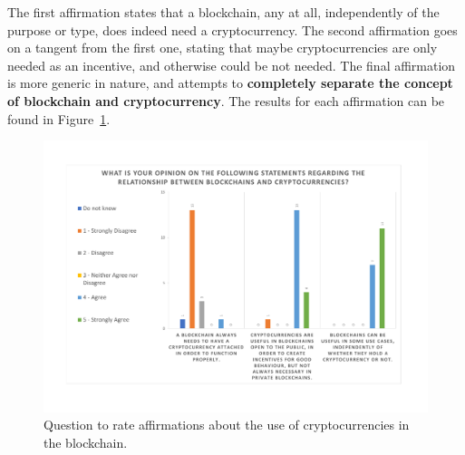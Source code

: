 The first affirmation states that a blockchain, any at all, independently of the purpose or type, does indeed need a cryptocurrency. The second affirmation goes on a tangent from the first one, stating that maybe cryptocurrencies are only needed as an incentive, and otherwise could be not needed. The final affirmation is more generic in nature, and attempts to \textbf{completely separate the concept of blockchain and cryptocurrency}. The results for each affirmation can be found in Figure~\ref{fig:blockchain_crypto_opinions}. %
\begin{figure}[h]
\centering
\includegraphics[scale=1]{media/survey_group2/blockchain_crypto_opinions.pdf}
\caption{Question to rate affirmations about the use of cryptocurrencies in the blockchain.}
\label{fig:blockchain_crypto_opinions}
\end{figure}



